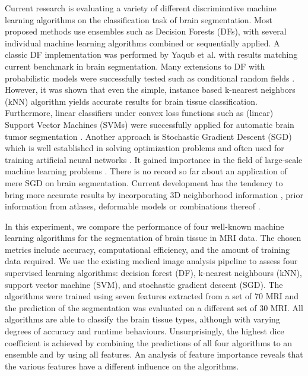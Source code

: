 \documentclass[journal]{IEEEtran}
\begin{document}
Current research is evaluating a variety of different discriminative machine learning algorithms on the classification task of brain segmentation. Most proposed methods use ensembles such as Decision Forests (DFs), with several individual machine learning algorithms combined or sequentially applied. A classic DF implementation was performed by Yaqub et al. \cite{Yaqub2014} with results matching current benchmark in brain segmentation. Many extensions to DF with probabilistic models were successfully tested such as conditional random fields \cite{Pereira2016}. However, it was shown that even the simple, instance based k-nearest neighbors (kNN) algorithm yields accurate results \cite{Anbeek2004,Cocosco2003,Warfield2000} for brain tissue classification. Furthermore, linear classifiers under convex loss functions such as (linear) Support Vector Machines (SVMs) were successfully applied for automatic brain tumor segmentation \cite{Bauer2011}. Another approach is Stochastic Gradient Descent (SGD) which is well established in solving optimization problems and often used for training artificial neural networks \cite{LeCun1998}. It gained importance in the field of large-scale machine learning problems \cite{Bottou2010}. There is no record so far about an application of mere SGD on brain segmentation. Current development has the tendency to bring more accurate results by incorporating 3D neighborhood information \cite{Li2011,Despotovic2013}, prior information from atlases\cite{Pohl2006,Ashburner2005}, deformable models \cite{Moreno2014} or combinations thereof \cite{Ortiz2014}.

In this experiment, we compare the performance of four well-known machine learning algorithms for the segmentation of brain tissue in MRI data. The chosen metrics include accuracy, computational efficiency, and the amount of training data required. We use the existing medical image analysis pipeline to assess four supervised learning algorithms: decision forest (DF), k-nearest neighbours (kNN), support vector machine (SVM), and stochastic gradient descent (SGD). The algorithms were trained using seven features extracted from a set of 70 MRI and the prediction of the segmentation was evaluated on a different set of 30 MRI. All algorithms are able to classify the brain tissue types, although with varying degrees of accuracy and runtime behaviours. Unsurprisingly, the highest dice coefficient is achieved by combining the predictions of all four algorithms to an ensemble and by using all features. An analysis of feature importance reveals that the various features have a different influence on the algorithms.
\end{document}
